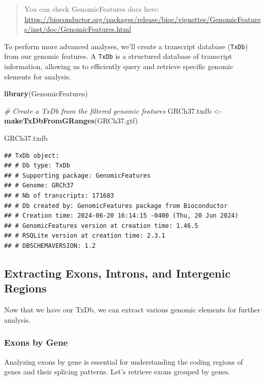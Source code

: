 \documentclass[
]{book}
\newenvironment{Shaded}{\begin{snugshade}}{\end{snugshade}}
\newcommand{\CommentTok}[1]{\textcolor[rgb]{0.56,0.35,0.01}{\textit{#1}}}
\newcommand{\FunctionTok}[1]{\textcolor[rgb]{0.13,0.29,0.53}{\textbf{#1}}}
\newcommand{\NormalTok}[1]{#1}
\newcommand{\OtherTok}[1]{\textcolor[rgb]{0.56,0.35,0.01}{#1}}
\begin{document}
\begin{quote}
You can check GenomicFeatures docs here: \url{https://bioconductor.org/packages/release/bioc/vignettes/GenomicFeatures/inst/doc/GenomicFeatures.html}
\end{quote}

To perform more advanced analyses, we'll create a transcript database (\texttt{TxDb}) from our genomic features. A \texttt{TxDb} is a structured database of transcript information, allowing us to efficiently query and retrieve specific genomic elements for analysis.

\begin{Shaded}
\begin{Highlighting}[]
\FunctionTok{library}\NormalTok{(GenomicFeatures)}

\CommentTok{\# Create a TxDb from the filtered genomic features}
\NormalTok{GRCh37.txdb }\OtherTok{\textless{}{-}} \FunctionTok{makeTxDbFromGRanges}\NormalTok{(GRCh37.gtf)}

\NormalTok{GRCh37.txdb}
\end{Highlighting}
\end{Shaded}

\begin{verbatim}
## TxDb object:
## # Db type: TxDb
## # Supporting package: GenomicFeatures
## # Genome: GRCh37
## # Nb of transcripts: 171683
## # Db created by: GenomicFeatures package from Bioconductor
## # Creation time: 2024-06-20 16:14:15 -0400 (Thu, 20 Jun 2024)
## # GenomicFeatures version at creation time: 1.46.5
## # RSQLite version at creation time: 2.3.1
## # DBSCHEMAVERSION: 1.2
\end{verbatim}

\hypertarget{extracting-exons-introns-and-intergenic-regions}{%
\subsection{Extracting Exons, Introns, and Intergenic Regions}\label{extracting-exons-introns-and-intergenic-regions}}

Now that we have our TxDb, we can extract various genomic elements for further analysis.

\hypertarget{exons-by-gene}{%
\subsubsection{Exons by Gene}\label{exons-by-gene}}

Analyzing exons by gene is essential for understanding the coding regions of genes and their splicing patterns. Let's retrieve exons grouped by genes.
\end{document}
